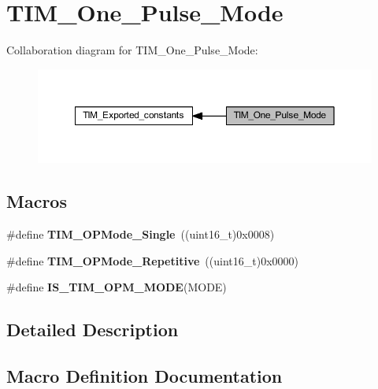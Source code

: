 \hypertarget{group___t_i_m___one___pulse___mode}{}\section{T\+I\+M\+\_\+\+One\+\_\+\+Pulse\+\_\+\+Mode}
\label{group___t_i_m___one___pulse___mode}
Collaboration diagram for T\+I\+M\+\_\+\+One\+\_\+\+Pulse\+\_\+\+Mode\+:\nopagebreak
\begin{figure}[H]
\begin{center}
\leavevmode
\includegraphics[width=350pt]{group___t_i_m___one___pulse___mode}
\end{center}
\end{figure}
\subsection*{Macros}
\begin{DoxyCompactItemize}
\item 
\mbox{\label{group___t_i_m___one___pulse___mode_ga99d934fdbc54ea4ee2cf5c86860f9227}} 
\#define {\bfseries T\+I\+M\+\_\+\+O\+P\+Mode\+\_\+\+Single}~((uint16\+\_\+t)0x0008)
\item 
\mbox{\label{group___t_i_m___one___pulse___mode_gad921d739c86bf48dca12442a81ad68ad}} 
\#define {\bfseries T\+I\+M\+\_\+\+O\+P\+Mode\+\_\+\+Repetitive}~((uint16\+\_\+t)0x0000)
\item 
\#define {\bfseries I\+S\+\_\+\+T\+I\+M\+\_\+\+O\+P\+M\+\_\+\+M\+O\+DE}(M\+O\+DE)
\end{DoxyCompactItemize}


\subsection{Detailed Description}


\subsection{Macro Definition Documentation}
\mbox{\label{group___t_i_m___one___pulse___mode_ga3f4a4305b4feacb4322eb4a358e54637}} 
